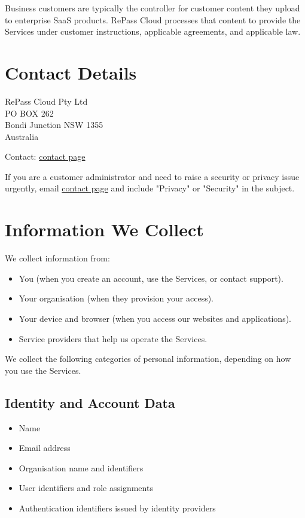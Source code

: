 \documentclass[11pt]{article}
\begin{document}
Business customers are typically the controller for customer content they upload to enterprise SaaS products. RePass Cloud processes that content to provide the Services under customer instructions, applicable agreements, and applicable law.

\section{Contact Details}

RePass Cloud Pty Ltd \\
PO BOX 262 \\
Bondi Junction NSW 1355 \\
Australia

Contact: \href{/contact}{contact page}

If you are a customer administrator and need to raise a security or privacy issue urgently, email \href{/contact}{contact page} and include "Privacy" or "Security" in the subject.

\section{Information We Collect}

We collect information from:

\begin{itemize}
\item You (when you create an account, use the Services, or contact support).
\item Your organisation (when they provision your access).
\item Your device and browser (when you access our websites and applications).
\item Service providers that help us operate the Services.
\end{itemize}

We collect the following categories of personal information, depending on how you use the Services.

\subsection{Identity and Account Data}

\begin{itemize}
\item Name
\item Email address
\item Organisation name and identifiers
\item User identifiers and role assignments
\item Authentication identifiers issued by identity providers
\end{itemize}
\end{document}
